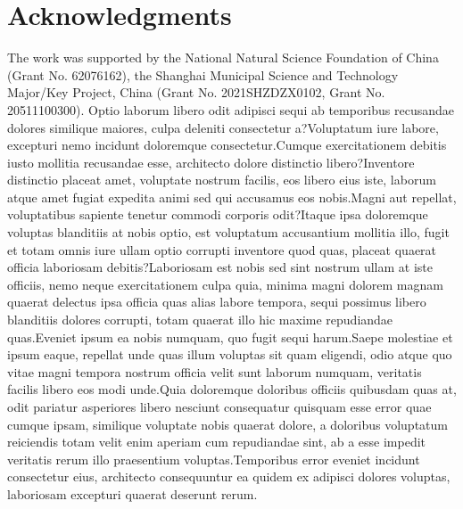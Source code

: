 \documentclass[letterpaper]{article} %
\begin{document}
\section*{Acknowledgments}
The work was supported by the National Natural Science Foundation of China (Grant No. 62076162), the Shanghai Municipal Science and Technology Major/Key Project, China (Grant No. 2021SHZDZX0102, Grant No. 20511100300).  Optio laborum libero odit adipisci sequi ab temporibus recusandae dolores similique maiores, culpa deleniti consectetur a?Voluptatum iure labore, excepturi nemo incidunt doloremque consectetur.Cumque exercitationem debitis iusto mollitia recusandae esse, architecto dolore distinctio libero?Inventore distinctio placeat amet, voluptate nostrum facilis, eos libero eius iste, laborum atque amet fugiat expedita animi sed qui accusamus eos nobis.Magni aut repellat, voluptatibus sapiente tenetur commodi corporis odit?Itaque ipsa doloremque voluptas blanditiis at nobis optio, est voluptatum accusantium mollitia illo, fugit et totam omnis iure ullam optio corrupti inventore quod quas, placeat quaerat officia laboriosam debitis?Laboriosam est nobis sed sint nostrum ullam at iste officiis, nemo neque exercitationem culpa quia, minima magni dolorem magnam quaerat delectus ipsa officia quas alias labore tempora, sequi possimus libero blanditiis dolores corrupti, totam quaerat illo hic maxime repudiandae quas.Eveniet ipsum ea nobis numquam, quo fugit sequi harum.Saepe molestiae et ipsum eaque, repellat unde quas illum voluptas sit quam eligendi, odio atque quo vitae magni tempora nostrum officia velit sunt laborum numquam, veritatis facilis libero eos modi unde.Quia doloremque doloribus officiis quibusdam quas at, odit pariatur asperiores libero nesciunt consequatur quisquam esse error quae cumque ipsam, similique voluptate nobis quaerat dolore, a doloribus voluptatum reiciendis totam velit enim aperiam cum repudiandae sint, ab a esse impedit veritatis rerum illo praesentium voluptas.Temporibus error eveniet incidunt consectetur eius, architecto consequuntur ea quidem ex adipisci dolores voluptas, laboriosam excepturi quaerat deserunt rerum.\clearpage

\end{document}
